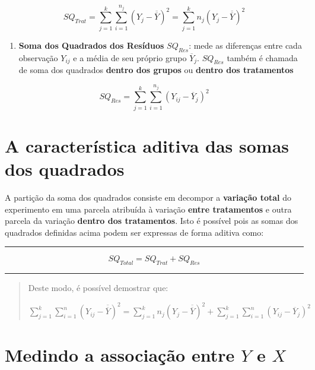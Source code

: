\documentclass[
]{book}
\providecommand{\tightlist}{%
  \setlength{\itemsep}{0pt}\setlength{\parskip}{0pt}}
\begin{document}
\[SQ_{Trat} = \sum_{j = 1}^{k}\sum_{i = 1}^{n_{j}}(Y_{j} - \overline{\overline{Y}})^2 = \sum_{j = 1}^{k}n_{j}(Y_{j} - \overline{\overline{Y}})^2\]

\begin{enumerate}
\def\labelenumi{\arabic{enumi}.}
\setcounter{enumi}{2}
\tightlist
\item
  \textbf{Soma dos Quadrados dos Resíduos} \(SQ_{Res}\): mede as diferenças entre cada observação \(Y_{ij}\) e a média de seu próprio grupo \(\overline{Y}_{j}\). \(SQ_{Res}\) também é chamada de soma dos quadrados \textbf{dentro dos grupos} ou \textbf{dentro dos tratamentos}
\end{enumerate}

\[SQ_{Res} = \sum_{j = 1}^{k}\sum_{i = 1}^{n_{j}}(Y_{ij} - \overline{Y}_{j})^2\]

\hypertarget{a-caracteruxedstica-aditiva-das-somas-dos-quadrados}{%
\section{A característica aditiva das somas dos quadrados}\label{a-caracteruxedstica-aditiva-das-somas-dos-quadrados}}

A partição da soma dos quadrados consiste em decompor a \textbf{variação total} do experimento em uma parcela atribuída à variação \textbf{entre tratamentos} e outra parcela da variação \textbf{dentro dos tratamentos}. Isto é possível pois as somas dos quadrados definidas acima podem ser expressas de forma aditiva como:

\begin{center}\rule{0.5\linewidth}{0.5pt}\end{center}

\[SQ_{Total} = SQ_{Trat} + SQ_{Res}\]

\begin{center}\rule{0.5\linewidth}{0.5pt}\end{center}

\begin{quote}
Deste modo, é possível demostrar que:

\(\sum_{j = 1}^{k}\sum_{i = 1}^{n}(Y_{ij} - \overline{\overline{Y}})^2 = \sum_{j = 1}^{k}n_{j}(Y_{j} - \overline{\overline{Y}})^2 + \sum_{j = 1}^{k}\sum_{i = 1}^{n}(Y_{ij} - \overline{Y}_{j})^2\)
\end{quote}

\hypertarget{medindo-a-associauxe7uxe3o-entre-y-e-x}{%
\section{\texorpdfstring{Medindo a associação entre \(Y\) e \(X\)}{Medindo a associação entre Y e X}}\label{medindo-a-associauxe7uxe3o-entre-y-e-x}}
\end{document}
